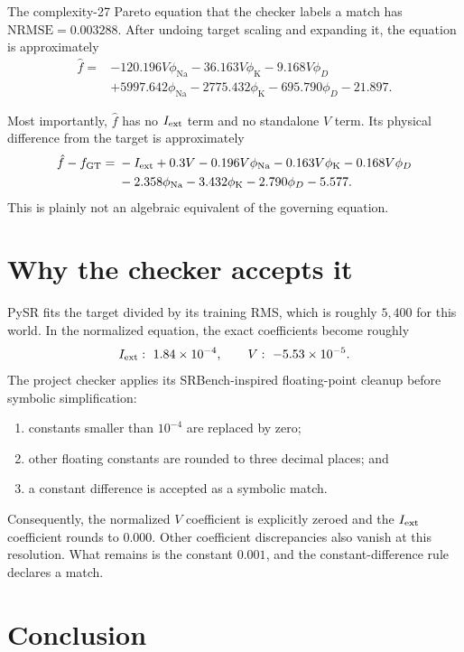 \documentclass[11pt]{article}
\newcommand{\nrmse}{\mathrm{NRMSE}}
\newcommand{\phina}{\phi_{\mathrm{Na}}}
\newcommand{\phik}{\phi_{\mathrm{K}}}
\begin{document}
The complexity-27 Pareto equation that the checker labels a match has
$\nrmse=0.003288$.  After undoing target scaling and expanding it, the equation is
approximately
\begin{align*}
\hat f={}&-120.196V\phina-36.163V\phik-9.168V\phi_D\\
&+5997.642\phina-2775.432\phik-695.790\phi_D-21.897.
\end{align*}

Most importantly, $\hat f$ has no $I_{\rm ext}$ term and no standalone $V$
term.  Its physical difference from the target is approximately
\begin{align*}
\hat f-f_{\rm GT}={}&-I_{\rm ext}+0.3V
-0.196V\phina-0.163V\phik-0.168V\phi_D\\
&-2.358\phina-3.432\phik-2.790\phi_D-5.577.
\end{align*}
This is plainly not an algebraic equivalent of the governing equation.

\section*{Why the checker accepts it}

PySR fits the target divided by its training RMS, which is roughly $5{,}400$ for
this world.  In the normalized equation, the exact coefficients become roughly
\[
I_{\rm ext}:\ 1.84\times10^{-4},
\qquad
V:\ -5.53\times10^{-5}.
\]
The project checker applies its SRBench-inspired floating-point cleanup before
symbolic simplification:

\begin{enumerate}
  \item constants smaller than $10^{-4}$ are replaced by zero;
  \item other floating constants are rounded to three decimal places; and
  \item a constant difference is accepted as a symbolic match.
\end{enumerate}

Consequently, the normalized $V$ coefficient is explicitly zeroed and the
$I_{\rm ext}$ coefficient rounds to $0.000$.  Other coefficient discrepancies
also vanish at this resolution.  What remains is the constant $0.001$, and the
constant-difference rule declares a match.

\section*{Conclusion}
\end{document}
